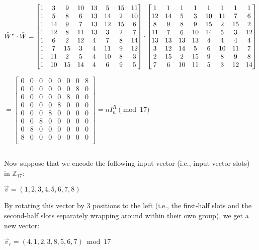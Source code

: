 $\tilde{W}^* \cdot \tilde{W} = \begin{bmatrix}
1&3&9&10&13&5&15&11\\
1&5&8&6&13&14&2&10\\
1&14&9&7&13&12&15&6\\
1&12&8&11&13&3&2&7\\
1&6&2&12&4&7&8&14\\
1&7&15&3&4&11&9&12\\
1&11&2&5&4&10&8&3\\
1&10&15&14&4&6&9&5\\
\end{bmatrix} \cdot \begin{bmatrix}
1 & 1 & 1 & 1 & 1 & 1 & 1 & 1\\
12&14&5&3&10&11&7&6\\
8&9&8&9&15&2&15&2\\
11&7&6&10&14&5&3&12\\
13&13&13&13&4&4&4&4\\
3&12&14&5&6&10&11&7\\
2&15&2&15&9&8&9&8\\
7&6&10&11&5&3&12&14\\
\end{bmatrix}$

$ = \begin{bmatrix}
0 & 0 & 0 & 0 & 0 & 0 & 0 & 8\\
0 & 0 & 0 & 0 & 0 & 0 & 8 & 0\\
0 & 0 & 0 & 0 & 0 & 8 & 0 & 0\\
0 & 0 & 0 & 0 & 8 & 0 & 0 & 0\\
0 & 0 & 0 & 8 & 0 & 0 & 0 & 0\\
0 & 0 & 8 & 0 & 0 & 0 & 0 & 0\\
0 & 8 & 0 & 0 & 0 & 0 & 0 & 0\\
8 & 0 & 0 & 0 & 0 & 0 & 0 & 0\\
\end{bmatrix} = n I_n^{R} \pmod{17}$

$ $

Now suppose that we encode the following input vector (i.e., input vector slots) in $\mathbb{Z}_{17}$:

$\vec{v} = (1, 2, 3, 4, 5, 6, 7, 8)$

By rotating this vector by 3 positions to the left (i.e., the first-half slots and the second-half slots separately wrapping around within their own group), we get a new vector:

$\vec{v}_r = (4, 1, 2, 3, 8, 5, 6, 7) \bmod 17$

